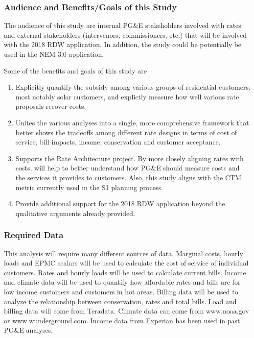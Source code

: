 \documentclass[12pt]{article}
\begin{document}
\subsubsection*{Audience and Benefits/Goals of this Study}

The audience of this study are internal PG\&E stakeholders involved with rates and external stakeholders (intervenors, commissioners, etc.) that will be involved with the 2018 RDW application. In addition, the study could be potentially be used in the NEM 3.0 application.

Some of the benefits and goals of this study are 

\begin{enumerate}
\item Explicitly quantify the subsidy among various groups of residential customers, most notably solar customers, and explictly measure how well various rate proposals recover costs.

\item Unites the various analyses into a single, more comprehensive framework that better shows the tradeoffs among different rate designs in terms of cost of service, bill impacts, income, conservation and customer acceptance.

\item Supports the Rate Architecture project. By more closely aligning rates with costs, will help to better understand how PG\&E should measure costs and the services it provides to customers. Also, this study aligns with the CTM metric currently used in the S1 planning process.

\item Provide additional support for the 2018 RDW application beyond the qualitative arguments already provided.   
\end{enumerate} 

\subsubsection*{Required Data}

This analysis will require many different sources of data. Marginal costs, hourly loads and EPMC scalars will be used to calculate the cost of service of individual customers. Rates and hourly loads will be used to calculate current bills. Income and climate data will be used to quantify how affordable rates and bills are for low income customers and customers in hot areas. Billing data will be used to analyze the relationship between conservation, rates and total bills. Load and billing data will come from Teradata. Climate data can come from www.noaa.gov or www.wunderground.com. Income data from Experian has been used in past PG\&E analyses.
\end{document}
